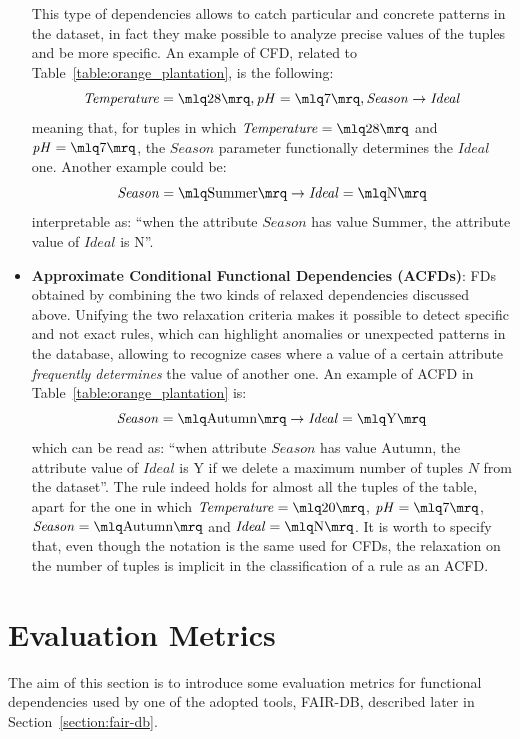 \begin{itemize}
This type of dependencies allows to catch particular and concrete patterns in the dataset, in fact they make possible to analyze precise values of the tuples and be more specific. An example of CFD, related to Table~\ref{table:orange_plantation}, is the following: \[\mathit{Temperature} = \mlq 28 \mrq, \mathit{pH} = \mlq 7 \mrq, \mathit{Season} \rightarrow \mathit{Ideal}\] meaning that, for tuples in which \(\mathit{Temperature} = \mlq 28 \mrq\) and \(\mathit{pH} = \mlq 7 \mrq\), the \(\mathit{Season}\) parameter functionally determines the \(\mathit{Ideal}\) one. Another example could be: \[\mathit{Season} = \mlq \mathrm{Summer} \mrq \rightarrow \mathit{Ideal} = \mlq \mathrm{N} \mrq\] interpretable as: ``when the attribute \(\mathit{Season}\) has value \(\mathrm{Summer}\), the attribute value of \(\mathit{Ideal}\) is \(\mathrm{N}\)''.
\item \textbf{Approximate Conditional Functional Dependencies (ACFDs)}: FDs obtained by combining the two kinds of relaxed dependencies discussed above. Unifying the two relaxation criteria makes it possible to detect specific and not exact rules, which can highlight anomalies or unexpected patterns in the database, allowing to recognize cases where a value of a certain attribute \textit{frequently determines} the value of another one. An example of ACFD in Table~\ref{table:orange_plantation} is: \[\mathit{Season} = \mlq \mathrm{Autumn} \mrq \rightarrow \mathit{Ideal} = \mlq \mathrm{Y} \mrq\] which can be read as: ``when attribute \(\mathit{Season}\) has value \(\mathrm{Autumn}\), the attribute value of \(\mathit{Ideal}\) is \(\mathrm{Y}\) if we delete a maximum number of tuples \(N\) from the dataset''. The rule indeed holds for almost all the tuples of the table, apart for the one in which \(\mathit{Temperature} = \mlq 20 \mrq\), \(\mathit{pH} = \mlq 7 \mrq\), \(\mathit{Season} = \mlq \mathrm{Autumn} \mrq\) and \(\mathit{Ideal} = \mlq \mathrm{N} \mrq\). It is worth to specify that, even though the notation is the same used for CFDs, the relaxation on the number of tuples is implicit in the classification of a rule as an ACFD.
\end{itemize}


\section{Evaluation Metrics}
\label{section:evaluation_metrics}
The aim of this section is to introduce some evaluation metrics for functional dependencies used by one of the adopted tools, FAIR-DB, described later in Section~\ref{section:fair-db}.

